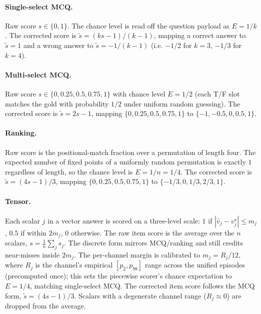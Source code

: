 \paragraph{Single-select MCQ.} Raw score $s\in\{0,1\}$. The chance level is read off the question payload as $E=1/k$. The corrected score is $\tilde{s} = (ks - 1)/(k-1)$, mapping a correct answer to $\tilde{s} = 1$ and a wrong answer to $\tilde{s} = -1/(k-1)$ (i.e. $-1/2$ for $k=3$, $-1/3$ for $k=4$).

\paragraph{Multi-select MCQ.} Raw score $s \in \{0, 0.25, 0.5, 0.75, 1\}$ with chance level $E = 1/2$ (each T/F slot matches the gold with probability $1/2$ under uniform random guessing). The corrected score is $\tilde{s} = 2s - 1$, mapping $\{0, 0.25, 0.5, 0.75, 1\}$ to $\{-1, -0.5, 0, 0.5, 1\}$.

\paragraph{Ranking.} Raw score is the positional-match fraction over a permutation of length four. The expected number of fixed points of a uniformly random permutation is exactly $1$ regardless of length, so the chance level is $E = 1/n = 1/4$. The corrected score is $\tilde{s} = (4s - 1)/3$, mapping $\{0, 0.25, 0.5, 0.75, 1\}$ to $\{-1/3, 0, 1/3, 2/3, 1\}$.

\paragraph{Tensor.} Each scalar $j$ in a vector answer is scored on a three-level scale: $1$ if $|\hat{v}_j - v_j^{\star}| \leq m_j$, $0.5$ if within $2 m_j$, $0$ otherwise. The raw item score is the average over the $n$ scalars, $s = \tfrac{1}{n}\sum_j s_j$. The discrete form mirrors MCQ/ranking and still credits near-misses inside $2 m_j$. The per-channel margin is calibrated to $m_j = R_j / 12$, where $R_j$ is the channel's empirical $[p_2, p_{98}]$ range across the unified episodes (precomputed once); this sets the piecewise scorer's chance expectation to $E = 1/4$, matching single-select MCQ. The corrected item score follows the MCQ form, $\tilde{s} = (4s - 1)/3$. Scalars with a degenerate channel range ($R_j \approx 0$) are dropped from the average.

